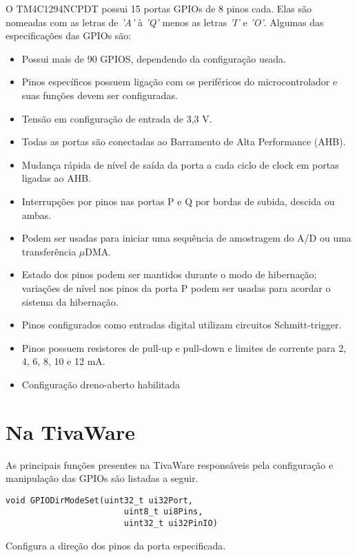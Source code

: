 O TM4C1294NCPDT possui 15 portas GPIOs de 8 pinos cada. Elas são nomeadas com as letras de \emph{'A'} à \emph{'Q'} menos as letras \emph{'I'} e \emph{'O'}. Algumas das especificações das GPIOs são:

\begin{itemize}
	\item Possui mais de 90 GPIOS, dependendo da configuração usada.
	\item Pinos específicos possuem ligação com os periféricos do microcontrolador e suas funções devem ser configuradas.
	\item Tensão em configuração de entrada de 3,3 V.
	\item Todas as portas são conectadas ao Barramento de Alta Performance (AHB).
	\item Mudança rápida de nível de saída da porta a cada ciclo de clock em portas ligadas ao AHB.
	\item Interrupções por pinos nas portas P e Q por bordas de subida, descida ou ambas.
	\item Podem ser usadas para iniciar uma sequência de amostragem do A/D ou uma transferência $\mu$DMA.
	\item Estado dos pinos podem ser mantidos durante o modo de hibernação; variações de nível nos pinos da porta P podem ser usadas para acordar o sistema da hibernação.
	\item Pinos configurados como entradas digital utilizam circuitos Schmitt-trigger.
	\item Pinos possuem resistores de pull-up e pull-down e limites de corrente para 2, 4, 6, 8, 10 e 12 mA.
	\item Configuração dreno-aberto habilitada
\end{itemize}

\section{Na TivaWare}

As principais funções presentes na TivaWare responsáveis pela configuração e manipulação das GPIOs são listadas a seguir.

\begin{lstlisting}[style=funcao]
	void GPIODirModeSet(uint32_t ui32Port,
						uint8_t ui8Pins,
						uint32_t ui32PinIO)
\end{lstlisting}

Configura a direção dos pinos da porta especificada.

